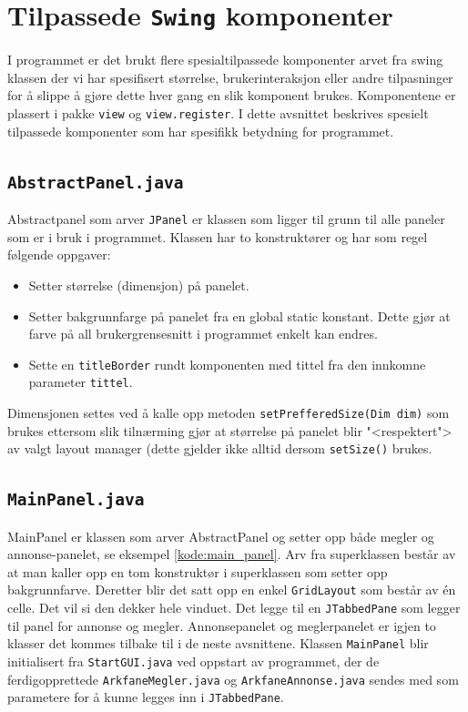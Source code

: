 \section[Swing komponenter]{Tilpassede \texttt{Swing} komponenter} \label{sec:swing}
I programmet er det brukt flere spesialtilpassede komponenter arvet fra swing klassen der vi har spesifisert størrelse, brukerinteraksjon eller andre tilpasninger for å slippe å gjøre dette hver gang en slik komponent brukes. Komponentene er plassert i pakke \texttt{view} og \texttt{view.register}. I dette avsnittet beskrives spesielt tilpassede komponenter som har spesifikk betydning for programmet.

\subsection{\texttt{AbstractPanel.java}} \label{subsec:AbstractPanel}
Abstractpanel som arver \texttt{JPanel} er klassen som ligger til grunn til alle paneler som er i bruk i programmet. Klassen har to konstruktører og har som regel følgende oppgaver:
\begin{itemize}
\item Setter størrelse (dimensjon) på panelet.
\item Setter bakgrunnfarge på panelet fra en global static konstant. Dette gjør at farve på all brukergrensesnitt i programmet enkelt kan endres.
\item Sette en \texttt{titleBorder} rundt komponenten med tittel fra den innkomne parameter \texttt{tittel}. 
\end{itemize}
Dimensjonen settes ved å kalle opp metoden \texttt{setPrefferedSize(Dim dim)} som brukes ettersom slik tilnærming gjør at størrelse på panelet blir "<respektert"> av valgt layout manager (dette gjelder ikke alltid dersom \texttt{setSize()} brukes.




\subsection{\texttt{MainPanel.java}}
MainPanel er klassen som arver AbstractPanel og setter opp både megler og annonse-panelet, se eksempel \ref{kode:main_panel}. Arv fra superklassen består av at man kaller opp en tom konstruktør i superklassen som setter opp bakgrunnfarve. Deretter blir det satt opp en enkel \texttt{GridLayout} som består av én celle. Det vil si den dekker hele vinduet. Det legge til en \texttt{JTabbedPane} som legger til panel for annonse og megler. Annonsepanelet og meglerpanelet er igjen to klasser det kommes tilbake til i de neste avsnittene. Klassen \texttt{MainPanel} blir initialisert fra \texttt{StartGUI.java} ved oppstart av programmet, der de ferdigopprettede \texttt{ArkfaneMegler.java} og \texttt{ArkfaneAnnonse.java} sendes med som parametere for å kunne legges inn i \texttt{JTabbedPane}.


